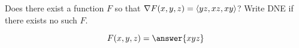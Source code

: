 \documentclass{ximera}
\author{David Guichard \and Neal Koblitz \and H. Jerome Keisler \and Albert Scheller \and Barry Balof \and Mike Wills \and Matthew Carr}
\begin{document}
\begin{exercise}




Does there exist a function $F$ so that $\nabla F(x,y,z)=\left\langle yz,xz,xy\right\rangle$? Write DNE if there exists no such $F$. 

\begin{prompt}
\[
F(x,y,z)=\answer{xyz}
\]
\end{prompt}

\end{exercise}
\end{document}
